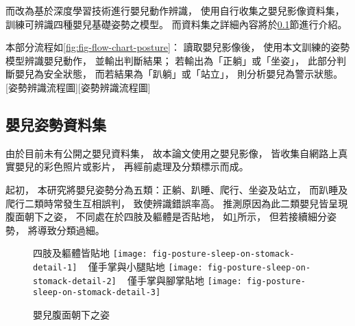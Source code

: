 \documentclass[class=NCU_thesis, crop=false]{standalone}
\begin{document}
而改為基於深度學習技術進行嬰兒動作辨識，
使用自行收集之嬰兒影像資料集，
訓練可辨識四種嬰兒基礎姿勢之模型。
而資料集之詳細內容將於\ref{sec:chapter_method_posture_dataset}節進行介紹。

本部分流程如\cref{fig:fig-flow-chart-posture}：
讀取嬰兒影像後，
使用本文訓練的姿勢模型辨識嬰兒動作，
並輸出判斷結果；
若輸出為「正躺」或「坐姿」，
此部分判斷嬰兒為安全狀態，
而若結果為「趴躺」或「站立」，
則分析嬰兒為警示狀態。
[姿勢辨識流程圖][姿勢辨識流程圖]

\subsection{嬰兒姿勢資料集}
\label{sec:chapter_method_posture_dataset}
由於目前未有公開之嬰兒資料集，
故本論文使用之嬰兒影像，
皆收集自網路上真實嬰兒的彩色照片或影片，
再經前處理及分類標示而成。

起初，
本研究將嬰兒姿勢分為五類：正躺、趴睡、爬行、坐姿及站立，
而趴睡及爬行二類時常發生互相誤判，
致使辨識錯誤率高。
推測原因為此二類嬰兒皆呈現腹面朝下之姿，
不同處在於四肢及軀體是否貼地，
如\cref{fig:fig-posture-sleep-on-stomack-detail}所示，
但若接續細分姿勢，
將導致分類過細。
\begin{figure}[!hbt]
    \centering
    \subcaptionbox
        {四肢及軀體皆貼地
        \label{fig:fig-posture-sleep-on-stomack-detail-1}}
        {\texttt{[image: fig-posture-sleep-on-stomack-detail-1]}}
    ~
    \subcaptionbox
        {僅手掌與小腿貼地
        \label{fig:fig-posture-sleep-on-stomack-detail-2}}
        {\texttt{[image: fig-posture-sleep-on-stomack-detail-2]}}
    ~
    \subcaptionbox
        {僅手掌與腳掌貼地
        \label{fig:fig-posture-sleep-on-stomack-detail-3}}
        {\texttt{[image: fig-posture-sleep-on-stomack-detail-3]}}
    \caption{嬰兒腹面朝下之姿}
    \label{fig:fig-posture-sleep-on-stomack-detail}
\end{figure}
\end{document}

